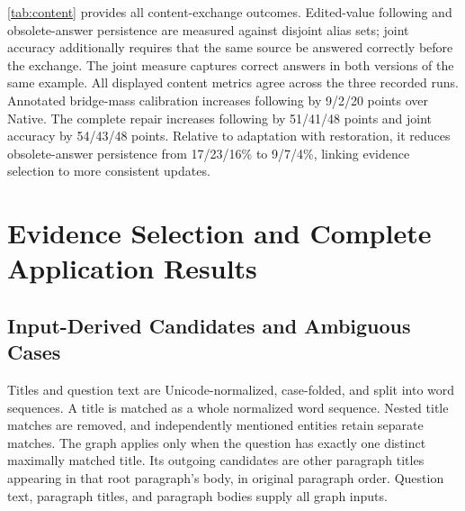 \cref{tab:content} provides all content-exchange outcomes. Edited-value following and obsolete-answer persistence are measured against disjoint alias sets; joint accuracy additionally requires that the same source be answered correctly before the exchange. The joint measure captures correct answers in both versions of the same example. All displayed content metrics agree across the three recorded runs. Annotated bridge-mass calibration increases following by 9/2/20 points over Native. The complete repair increases following by 51/41/48 points and joint accuracy by 54/43/48 points. Relative to adaptation with restoration, it reduces obsolete-answer persistence from 17/23/16\% to 9/7/4\%, linking evidence selection to more consistent updates.

\begin{table}[!htbp]
  \centering
  \caption{\textbf{Complete reciprocal content-exchange outcomes.} Accuracy (\%) on 100 composed queries from 25 shared-context quadruplets. Original accuracy uses the original answer, following uses the exchanged value, persistence uses the now-obsolete answer, and joint accuracy requires correctness before and after exchange. Values are mean $\pm$ sample SD across recorded runs; all SDs here are zero. Every example undergoes a valid reciprocal exchange.}
  \label{tab:content}
  \small\setlength{\tabcolsep}{5pt}
  
\end{table}

\section{Evidence Selection and Complete Application Results}
\label{app:application}

\subsection{Input-Derived Candidates and Ambiguous Cases}

Titles and question text are Unicode-normalized, case-folded, and split into word sequences. A title is matched as a whole normalized word sequence. Nested title matches are removed, and independently mentioned entities retain separate matches. The graph applies only when the question has exactly one distinct maximally matched title. Its outgoing candidates are other paragraph titles appearing in that root paragraph's body, in original paragraph order. Question text, paragraph titles, and paragraph bodies supply all graph inputs.

